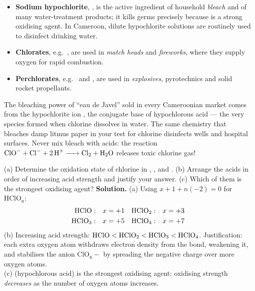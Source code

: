 \documentclass[11pt]{article}
\begin{document}
\begin{itemize}
\item \textbf{Sodium hypochlorite}, , is the active ingredient of household \emph{bleach} and of many water-treatment products; it kills germs precisely because  is a strong oxidising agent. In Cameroon, dilute hypochlorite solutions are routinely used to disinfect drinking water.
\item \textbf{Chlorates}, e.g.\ , are used in \emph{match heads} and \emph{fireworks}, where they supply oxygen for rapid combustion.
\item \textbf{Perchlorates}, e.g.\  and , are used in \emph{explosives}, pyrotechnics and solid rocket propellants.
\end{itemize}

\begin{savaistu}
The bleaching power of ``eau de Javel'' sold in every Cameroonian market comes from the hypochlorite ion , the conjugate base of hypochlorous acid  — the very species formed when chlorine dissolves in water. The same chemistry that bleaches damp litmus paper in your test for chlorine disinfects wells and hospital surfaces. Never mix bleach with acids: the reaction $\ce{ClO- + Cl- + 2H+ -> Cl2 + H2O}$ releases toxic chlorine gas!
\end{savaistu}

\begin{exoresolu}
(a) Determine the oxidation state of chlorine in , ,  and . (b) Arrange the acids in order of increasing acid strength and justify your answer. (c) Which of them is the strongest oxidising agent?
\tcblower
\textbf{Solution.} (a) Using $x + 1 + n(-2) = 0$ for \ensuremath{\mathrm{HClO_{n}}}:
\begin{align*}
\ce{HClO}:&\quad x = +1 & \ce{HClO2}:&\quad x = +3\\
\ce{HClO3}:&\quad x = +5 & \ce{HClO4}:&\quad x = +7
\end{align*}
(b) Increasing acid strength: $\ce{HClO} < \ce{HClO2} < \ce{HClO3} < \ce{HClO4}$. Justification: each extra oxygen atom withdraws electron density from the  bond, weakening it, and stabilises the anion \ensuremath{\mathrm{ClO_{n}-}} by spreading the negative charge over more oxygen atoms.\\[2pt]
(c)  (hypochlorous acid) is the strongest oxidising agent: oxidising strength \emph{decreases} as the number of oxygen atoms increases.
\end{exoresolu}
\end{document}
